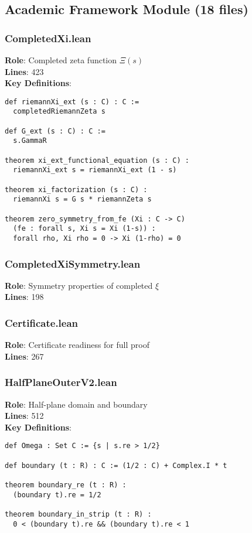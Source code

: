 \documentclass[12pt,a4paper]{article}
\begin{document}
\subsection{Academic Framework Module (18 files)}

\subsubsection{CompletedXi.lean}
\textbf{Role}: Completed zeta function $\Xi(s)$\\
\textbf{Lines}: 423\\
\textbf{Key Definitions}:
\begin{lstlisting}[language=Lean]
def riemannXi_ext (s : C) : C :=
  completedRiemannZeta s

def G_ext (s : C) : C :=
  s.GammaR

theorem xi_ext_functional_equation (s : C) :
  riemannXi_ext s = riemannXi_ext (1 - s)

theorem xi_factorization (s : C) :
  riemannXi s = G s * riemannZeta s

theorem zero_symmetry_from_fe (Xi : C -> C)
  (fe : forall s, Xi s = Xi (1-s)) :
  forall rho, Xi rho = 0 -> Xi (1-rho) = 0
\end{lstlisting}

\subsubsection{CompletedXiSymmetry.lean}
\textbf{Role}: Symmetry properties of completed $\xi$\\
\textbf{Lines}: 198

\subsubsection{Certificate.lean}
\textbf{Role}: Certificate readiness for full proof\\
\textbf{Lines}: 267

\subsubsection{HalfPlaneOuterV2.lean}
\textbf{Role}: Half-plane domain and boundary\\
\textbf{Lines}: 512\\
\textbf{Key Definitions}:
\begin{lstlisting}[language=Lean]
def Omega : Set C := {s | s.re > 1/2}

def boundary (t : R) : C := (1/2 : C) + Complex.I * t

theorem boundary_re (t : R) :
  (boundary t).re = 1/2

theorem boundary_in_strip (t : R) :
  0 < (boundary t).re && (boundary t).re < 1
\end{lstlisting}
\end{document}
